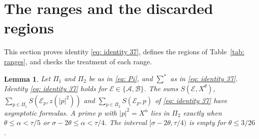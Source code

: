 \documentclass{article}
\numberwithin{equation}{section}
\newtheorem{lemma}{Lemma}
\newcommand{\Le}{\leqslant}
\begin{document}
\section{The ranges and the discarded regions}
\label{sec: decomposition}

This section proves identity \eqref{eq: identity 37}, defines the regions of Table~\ref{tab: ranges}, and checks the treatment of each range.

\begin{lemma}
\label{lem: identity 37}
Let $\Pi_1$ and $\Pi_2$ be as in \eqref{eq: Pi}, and $\sum^*$ as in \eqref{eq: identity 37}. Identity \eqref{eq: identity 37} holds for $\mathcal{E} \in \{\mathcal{A}, \mathcal{B}\}$. The sums $S(\mathcal{E}, X^{\theta})$, $\sum_{p \in \Pi_1} S(\mathcal{E}_p, z(|p|^2))$ and $\sum_{p \in \Pi_2} S(\mathcal{E}_p, p)$ of \eqref{eq: identity 37} have asymptotic formulas. A prime $p$ with $|p|^2 = X^{\alpha}$ lies in $\Pi_2$ exactly when $\theta \Le \alpha < \tau/5$ or $\sigma - 2\theta \Le \alpha < \tau/4$. The interval $[\sigma - 2\theta, \tau/4)$ is empty for $\theta \Le 3/26$.
\end{lemma}
\end{document}
